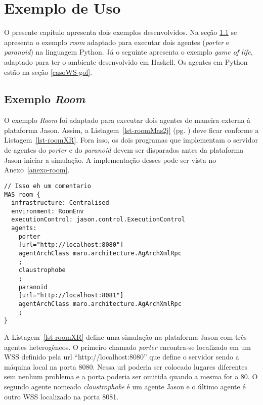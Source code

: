 \chapter{Exemplo de Uso} \label{chap-casoWS}

O presente capítulo apresenta dois exemplos desenvolvidos. Na
seção \ref{casoWS-room} se apresenta o exemplo \emph{room} adaptado para
executar dois agentes (\emph{porter} e \emph{paranoid}) na linguagem Python.
Já o seguinte apresenta o exemplo
\emph{game of life}, adaptado para ter o ambiente desenvolvido em Haskell. Os
agentes em Python estão na seção \ref{casoWS-gol}.

\section{Exemplo \emph{Room}} \label{casoWS-room}

O exemplo \emph{Room} foi adaptado para executar dois agentes de maneira
externa à plataforma Jason. Assim, a Listagem~\ref{lst-roomMas2j} (pg.
\pageref{lst-roomMas2j}) deve ficar conforme a Listagem~\ref{lst-roomXR}.
Fora isso, os dois programas que implementam o servidor de agentes do
\emph{porter} e do \emph{paranoid} devem ser disparados antes da plataforma
Jason iniciar a simulação. A implementação desses pode ser vista
no Anexo~\ref{anexo-room}.

\lstset{linewidth=100mm}
\begin{center}
    \begin{minipage}{100mm}
	\begin{lstlisting}[frame=trbl, caption=Arquivo de projeto do Jason adaptado., label=lst-roomXR]
// Isso eh um comentario
MAS room {
  infrastructure: Centralised
  environment: RoomEnv
  executionControl: jason.control.ExecutionControl
  agents:
    porter
    [url="http://localhost:8080"]
    agentArchClass maro.architecture.AgArchXmlRpc
    ;
    claustrophobe
    ;
    paranoid
    [url="http://localhost:8081"]
    agentArchClass maro.architecture.AgArchXmlRpc
    ;
}
	\end{lstlisting}
    \end{minipage}
\end{center}

A Listagem~\ref{lst-roomXR} define uma simulação na plataforma Jason com três
agentes heterogêneos. O primeiro chamado \emph{porter} encontra-se localizado
em um WSS definido pela url ``http://localhost:8080'' que define o
servidor sendo a máquina local na porta 8080. Nessa url poderia ser colocado
lugares diferentes sem nenhum problema e a porta poderia ser omitida quando a
mesma for a 80. O segundo agente nomeado \emph{claustrophobe} é um agente
Jason e o último agente é outro WSS localizado na porta 8081.

